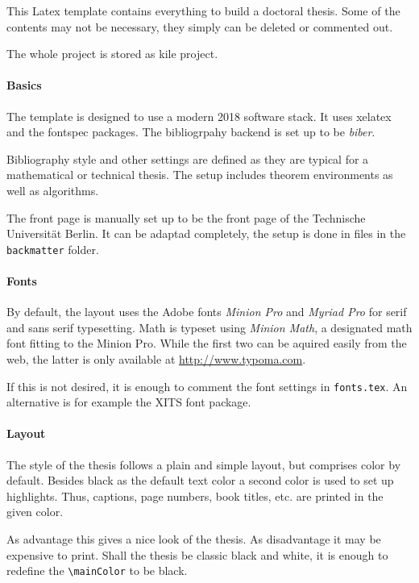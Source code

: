 This Latex template contains everything to build a doctoral thesis. Some of the contents may not be necessary, they simply can be deleted or commented out.

The whole project is stored as kile project.

\paragraph{Basics}
The template is designed to use a modern 2018 software stack. It uses xelatex and the fontspec packages. The bibliogrpahy backend is set up to be \emph{biber}.

Bibliography style and other settings are defined as they are typical for a mathematical or technical thesis. The setup includes theorem environments as well as algorithms.

The front page is manually set up to be the front page of the Technische Universität Berlin. It can be adaptad completely, the setup is done in files in the \texttt{backmatter} folder.

\paragraph{Fonts}
By default, the layout uses the Adobe fonts \emph{Minion Pro} and \emph{Myriad Pro} for serif and sans serif typesetting. Math is typeset using \emph{Minion Math}, a designated math font fitting to the Minion Pro. While the first two can be aquired easily from the web, the latter is only available at \url{http://www.typoma.com}.

If this is not desired, it is enough to comment the font settings in \texttt{fonts.tex}. An alternative is for example the XITS font package.

\paragraph{Layout}
The style of the thesis follows a plain and simple layout, but comprises color by default. Besides black as the default text color a second color is used to set up highlights. Thus, captions, page numbers, book titles, etc. are printed in the given color.

As advantage this gives a nice look of the thesis. As disadvantage it may be expensive to print. Shall the thesis be classic black and white, it is enough to redefine the \lstinline{\mainColor} to be black.

